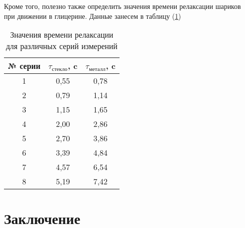\documentclass[12pt,a4paper]{article}
\begin{document}
Кроме того, полезно также определить значения времени релаксации шариков при движении в глицерине. Данные занесем в таблицу (\ref{tab:relax_time})

\begin{table}[h!]
\centering
\begin{tabular}{|c|c|c|}
\hline
№ серии & $\tau_{\text{стекло}}$, c & $\tau_{\text{металл}}$, c \\ \hline
1       & 0,55                   & 0,78                  \\ \hline
2       & 0,79                   & 1,14                  \\ \hline
3       & 1,15                   & 1,65                  \\ \hline
4       & 2,00                   & 2,86                  \\ \hline
5       & 2,70                   & 3,86                  \\ \hline
6       & 3,39                   & 4,84                  \\ \hline
7       & 4,57                   & 6,54                  \\ \hline
8       & 5,19                   & 7,42                  \\ \hline
\end{tabular}
\caption{Значения времени релаксации для различных серий измерений}
\label{tab:relax_time}
\end{table}

\section{Заключение}
\end{document}
